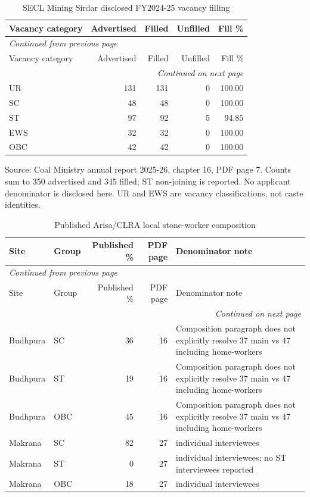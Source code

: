\documentclass[11pt,a4paper]{report}
\begin{document}
\begin{longtable}{lrrrr}
\caption{SECL Mining Sirdar disclosed FY2024-25 vacancy filling}\\\toprule
Vacancy category & Advertised & Filled & Unfilled & Fill \% \\\midrule\endfirsthead
\multicolumn{5}{l}{\textit{Continued from previous page}}\\\toprule
Vacancy category & Advertised & Filled & Unfilled & Fill \% \\\midrule\endhead
\midrule\multicolumn{5}{r}{\textit{Continued on next page}}\\\endfoot\bottomrule\endlastfoot
UR & 131 & 131 & 0 & 100.00 \\
SC & 48 & 48 & 0 & 100.00 \\
ST & 97 & 92 & 5 & 94.85 \\
EWS & 32 & 32 & 0 & 100.00 \\
OBC & 42 & 42 & 0 & 100.00 \\
\end{longtable}\endgroup
Source: Coal Ministry annual report 2025-26, chapter 16, PDF page 7. Counts sum to 350 advertised and 345 filled; ST non-joining is reported. No applicant denominator is disclosed here. UR and EWS are vacancy classifications, not caste identities.
\begingroup\footnotesize\setlength{\tabcolsep}{4pt}
\begin{longtable}{llrr>{\raggedright\arraybackslash}p{7cm}}
\caption{Published Arisa/\allowbreak{}CLRA local stone-worker composition}\\\toprule
Site & Group & Published \% & PDF page & Denominator note \\\midrule\endfirsthead
\multicolumn{5}{l}{\textit{Continued from previous page}}\\\toprule
Site & Group & Published \% & PDF page & Denominator note \\\midrule\endhead
\midrule\multicolumn{5}{r}{\textit{Continued on next page}}\\\endfoot\bottomrule\endlastfoot
Budhpura & SC & 36 & 16 & Composition paragraph does not explicitly resolve 37 main vs 47 including home-workers \\
Budhpura & ST & 19 & 16 & Composition paragraph does not explicitly resolve 37 main vs 47 including home-workers \\
Budhpura & OBC & 45 & 16 & Composition paragraph does not explicitly resolve 37 main vs 47 including home-workers \\
Makrana & SC & 82 & 27 & 50 individual interviewees \\
Makrana & ST & 0 & 27 & 50 individual interviewees; no ST interviewees reported \\
Makrana & OBC & 18 & 27 & 50 individual interviewees \\
\end{longtable}\endgroup
\end{document}
